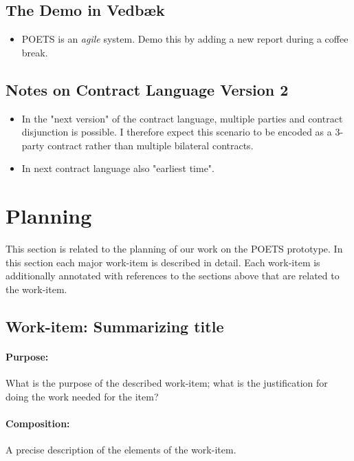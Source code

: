 \documentclass[envcountsame]{llncs}
\begin{document}
\subsection{The Demo in Vedbæk}
\label{sec:demo-vedbak}
\begin{itemize}
\item POETS is an \emph{agile} system. Demo this by adding a new
  report during a coffee break.
\end{itemize}

\subsection{Notes on Contract Language Version 2}
\label{sec:notes-contr-lang}
\begin{itemize}
\item In the "next version" of the contract language, multiple parties
  and contract disjunction is possible. I therefore expect this
  scenario to be encoded as a 3-party contract rather than multiple
  bilateral contracts.
\item In next contract language also "earliest time".
\end{itemize}

\section{Planning}

This section is related to the planning of our work on the POETS
prototype. In this section each major work-item is described in
detail. Each work-item is additionally annotated with references to
the sections above that are related to the work-item.


\subsection*{Work-item: Summarizing title}

\paragraph{Purpose:} What is the purpose of the described work-item;
what is the justification for doing the work needed for the item?

\paragraph{Composition:} A precise description of the elements of the
work-item.
\end{document}
